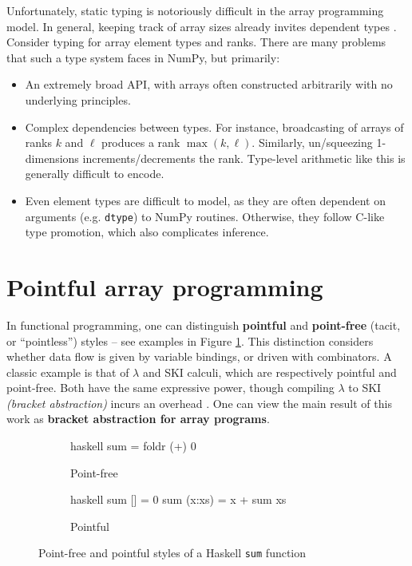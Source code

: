 Unfortunately, static typing is notoriously difficult in the array programming model. In general, keeping track of array sizes already invites dependent types \cite{henriksen2021towards}. Consider typing for array element types and ranks. There are many problems that such a type system faces in NumPy, but primarily:
\begin{itemize}
    \item An extremely broad API, with arrays often constructed arbitrarily with no underlying principles.
    \item Complex dependencies between types. For instance, broadcasting of arrays of ranks $k$ and $\ell$ produces a rank $\max(k, \ell)$. Similarly, un/squeezing 1-dimensions increments/decrements the rank. Type-level arithmetic like this is generally difficult to encode.
    \item Even element types are difficult to model, as they are often dependent on arguments (e.g. \texttt{dtype}) to NumPy routines. Otherwise, they follow C-like type promotion, which also complicates inference.
\end{itemize}

\section{Pointful array programming}
\label{pointful-array-programming}

In functional programming, one can distinguish \textbf{pointful} and \textbf{point-free} (tacit, or ``pointless'') styles -- see examples in Figure \ref{fig:point-haskell}. This distinction considers whether data flow is given by variable bindings, or driven with combinators. A classic example is that of $\lambda$ and SKI calculi, which are respectively pointful and point-free. Both have the same expressive power, though compiling $\lambda$ to SKI \textit{(bracket abstraction)} incurs an overhead \cite{lachowski2018complexity}. 
One can view the main result of this work as \textbf{bracket abstraction for array programs}.

\begin{figure}
\centering
\begin{subfigure}{.3\textwidth}
  \centering
    \begin{cminted}{haskell}
sum = foldr (+) 0
    \end{cminted}
      \caption{Point-free}
\end{subfigure}%
\begin{subfigure}{.3\textwidth}
  \centering
  \begin{cminted}{haskell}
sum [] = 0
sum (x:xs) = x + sum xs
  \end{cminted}
  \caption{Pointful}
\end{subfigure}
\caption{Point-free and pointful styles of a Haskell \texttt{sum} function}
\label{fig:point-haskell}
\end{figure}

